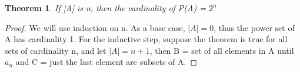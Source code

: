 \documentclass{article}
\newtheorem{theorem}{Theorem}[section]
\begin{document}
\begin{theorem}
    If |A| is n, then the cardinality of P(A) = $2^n$
\end{theorem}

\begin{proof}
    We will use induction on n. As a base case, $|A| = 0$, thus the power set of A has cardinality 1. 
    For the inductive step, suppose the theorem is true for all sets of cardinality n, and let $|A| = n+1$, 
    then B = set of all elements in A until $a_n$ and C = just the last element are subsets of A. 
\end{proof}
\end{document}
